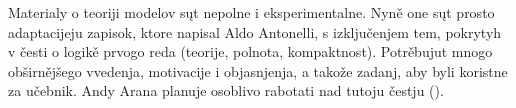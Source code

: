 \documentclass[../../include/open-logic-part]{subfiles}
\begin{document}


\begin{editorial}
  Materialy o teoriji modelov sųt nepolne i eksperimentalne. Nyně
  one sųt prosto adaptacijeju zapisok, ktore napisal Aldo Antonelli,
  s izključenjem tem, pokrytyh v česti o logikě prvogo reda
  (teorije, polnota, kompaktnost). Potrěbujut mnogo obširnějšego
  vvedenja, motivacije i objasnjenja, a takože zadanj, aby byli
  koristne za učebnik. Andy Arana planuje osoblivo rabotati nad
  tutoju čestju ().
\end{editorial}





\OLEndPartHook
\end{document}

